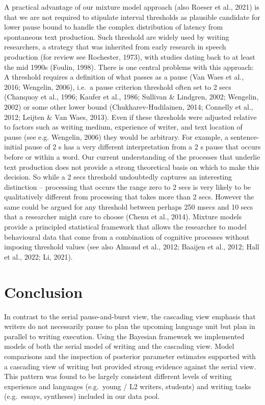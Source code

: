 \documentclass[
  english,
  man,floatsintext]{apa7}
\begin{document}
A practical advantage of our mixture model approach (also Roeser et al., 2021) is that we are not required to stipulate interval thresholds as plausible candidate for lower pause bound to handle the complex distribution of latency from spontaneous text production. Such threshold are widely used by writing researchers, a strategy that was inherited from early research in speech production (for review see Rochester, 1973), with studies dating back to at least the mid 1990s (Foulin, 1998). There is one central problems with this approach: A threshold requires a definition of what passes as a pause (Van Waes et al., 2016; Wengelin, 2006), i.e.~a pause criterion threshold often set to 2 secs (Chanquoy et al., 1996; Kaufer et al., 1986; Sullivan \& Lindgren, 2002; Wengelin, 2002) or some other lower bound (Chukharev-Hudilainen, 2014; Connelly et al., 2012; Leijten \& Van Waes, 2013). Even if these thresholds were adjusted relative to factors such as writing medium, experience of writer, and text location of pause (see e.g. Wengelin, 2006) they would be arbitrary. For example, a sentence-initial pause of 2 s has a very different interpretation from a 2 s pause that occurs before or within a word. Our current understanding of the processes that underlie text production does not provide a strong theoretical basis on which to make this decision. So while a 2 secs threshold undoubtedly captures an interesting distinction -- processing that occurs the range zero to 2 secs is very likely to be qualitatively different from processing that takes more than 2 secs. However the same could be argued for any threshold between perhaps 250 msecs and 10 secs that a researcher might care to choose (Chenu et al., 2014). Mixture models provide a principled statistical framework that allows the researcher to model behavioural data that come from a combination of cognitive processes without imposing threshold values (see also Almond et al., 2012; Baaijen et al., 2012; Hall et al., 2022; Li, 2021).

\hypertarget{conclusion}{%
\section{Conclusion}\label{conclusion}}

In contrast to the serial pause-and-burst view, the cascading view emphasis that writers do not necessarily pause to plan the upcoming language unit but plan in parallel to writing execution. Using the Bayesian framework we implemented models of both the serial model of writing and the cascading view. Model comparisons and the inspection of posterior parameter estimates supported with a cascading view of writing but provided strong evidence against the serial view. This pattern was found to be largely consistent different levels of writing experience and languages (e.g.~young / L2 writers, students) and writing tasks (e.g.~essays, syntheses) included in our data pool.
\end{document}

